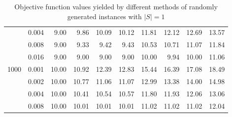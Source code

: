 \begin{table}[]
\begin{tabular}{rrrrrrrrrr}
& 0.004 & 9.00 & 9.86  & 10.09 & 10.12 & 11.81 & 12.12 & 12.69 & 13.57 \\
& 0.008 & 9.00 & 9.33  & 9.42  & 9.43  & 10.53 & 10.71 & 11.07 & 11.84 \\
& 0.016 & 9.00 & 9.00  & 9.00  & 9.00  & 10.00 & 9.94  & 10.00 & 11.06 \\
\hline
\multirow{5}{*}{1000} 
& 0.001 & 10.00 & 10.92 & 12.39 & 12.83 & 15.44 & 16.39 & 17.08 & 18.49 \\
& 0.002 & 10.00 & 10.77 & 11.06 & 11.07 & 12.99 & 13.38 & 14.00 & 14.98 \\
& 0.004 & 10.00 & 10.41 & 10.54 & 10.57 & 11.80 & 11.93 & 12.06 & 13.06 \\
& 0.008 & 10.00 & 10.01 & 10.01 & 10.01 & 11.02 & 11.02 & 11.02 & 12.04 \\
\end{tabular}
\caption{Objective function values yielded by different methods of randomly generated instances with $|S|=1$}
\label{tab:obj-s1}
\end{table}

